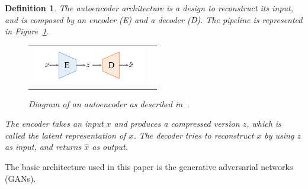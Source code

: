 \documentclass[12pt]{article}
\newtheorem{definition}{Definition}
\begin{document}
    \begin{definition}
        \normalfont
        The \emph{autoencoder} architecture is a design to reconstruct its input, and is composed by an \emph{encoder} (E) and a \emph{decoder} (D). The pipeline is represented in Figure~\ref{figure:diagram_of_autoencoder}.

        \begin{figure}[H]
            \centering
            \begin{tabular}{cc}
                \includegraphics[width = 50mm]{autoencoder}
            \end{tabular}
            \caption{Diagram of an autoencoder as described in~\cite{pmlr-v80-achlioptas18a}.}
            \label{figure:diagram_of_autoencoder}
        \end{figure}

        The encoder takes an input $x$ and produces a compressed version $z$, which is called the \emph{latent representation} of $x$. The decoder tries to reconstruct $x$ by using $z$ as input, and returns $\hat{x}$ as output.
    \end{definition}

    The basic architecture used in this paper is the generative adversarial networks (GANs).
\end{document}
